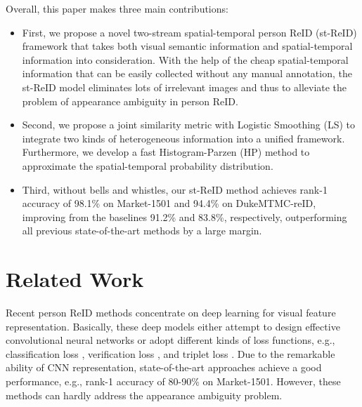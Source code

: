\documentclass[letterpaper]{article} %
\begin{document}
Overall, this paper makes three main contributions:
\begin{itemize}
  \item First, we propose a novel two-stream spatial-temporal person ReID (st-ReID) framework that takes both visual semantic information and spatial-temporal information into consideration. With the help of the cheap spatial-temporal information that can be easily collected without any manual annotation, the st-ReID model eliminates lots of irrelevant images and thus to alleviate the problem of appearance ambiguity in person ReID.

  \item Second, we propose a joint similarity metric with Logistic Smoothing (LS) to integrate two kinds of heterogeneous information into a unified framework. Furthermore, we develop a fast Histogram-Parzen (HP) method to approximate the spatial-temporal probability distribution.

  \item Third, without bells and whistles, our st-ReID method achieves rank-1 accuracy of 98.1\% on Market-1501 and 94.4\% on DukeMTMC-reID, improving from the baselines 91.2\% and 83.8\%, respectively, outperforming all previous state-of-the-art methods by a large margin.
\end{itemize}


\section{Related Work}
Recent person ReID methods concentrate on deep learning for visual feature representation. Basically, these deep models either attempt to design effective convolutional neural networks or adopt different kinds of loss functions, e.g., classification loss \cite{zheng2016mars,feng2018learning,Liang2018}, verification loss \cite{li2014deepreid,chen2015deep}, and triplet loss \cite{ding2015deep,wang2017tcsvt,HermansBL17,Wang2016DARI}. Due to the remarkable ability of CNN representation, state-of-the-art approaches achieve a good performance, e.g., rank-1 accuracy of 80-90\% on Market-1501. However, these methods can hardly address the appearance ambiguity problem.
\end{document}
